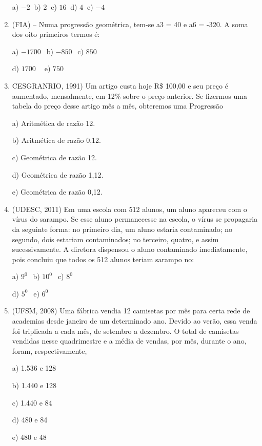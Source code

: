 \begin{multicols*}{2}
\begin{enumerate}
		      a) $-2 \ $ b) $2 \ $ c) $16 \ $ d) $4 \ $ e) $-4$

		\item (FIA) – Numa progressão geométrica, tem-se a3 = 40 e a6 = -320. A soma dos oito primeiros termos é:

		      a) $-1700 \ \ $ b) $-850 \ \ $ c) $850 \ \ $

		      d) $1700 \ \ \ \ $ e) $750 $

		\item CESGRANRIO, 1991) Um artigo custa hoje R\$ 100,00 e seu preço é aumentado, mensalmente, em 12\% sobre o preço anterior. Se fizermos uma tabela do preço desse artigo mês a mês, obteremos uma Progressão

		      a) Aritmética de razão 12.

		      b) Aritmética de razão 0,12.

		      c) Geométrica de razão 12.

		      d) Geométrica de razão 1,12.

		      e) Geométrica de razão 0,12.

		\item (UDESC, 2011) Em uma escola com 512 alunos, um aluno apareceu com o vírus do sarampo. Se esse aluno permanecesse na escola, o vírus se propagaria da seguinte forma: no primeiro dia, um aluno estaria contaminado; no segundo, dois estariam contaminados; no terceiro, quatro, e assim sucessivamente. A diretora dispensou o aluno contaminado imediatamente, pois concluiu que todos os 512 alunos teriam sarampo no:

		      a) $9^0 \ \ $ b) $10^0 \ \ $ c) $8^0 \ \ $

		      d) $5^0 \ \ $ e) $6^0 $

		\item (UFSM, 2008) Uma fábrica vendia 12 camisetas por mês para certa rede de academias desde janeiro de um determinado ano. Devido ao verão, essa venda foi triplicada a cada mês, de setembro a dezembro. O total de camisetas vendidas nesse quadrimestre e a média de vendas, por mês, durante o ano, foram, respectivamente,

		      a) 1.536 e 128

		      b) 1.440 e 128

		      c) 1.440 e 84

		      d) 480 e 84

		      e) 480 e 48



	\end{enumerate}


\end{multicols*}
